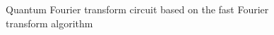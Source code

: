 \begin{figure}
\centering



\caption{Quantum Fourier transform circuit based on the fast Fourier transform algorithm}
\label{figQuantCompQuantFourier}
\end{figure}